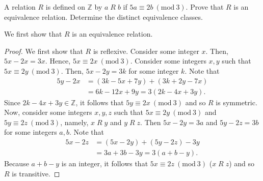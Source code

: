 \documentclass[12pt]{article}
\newcommand{\Z}{\mathbb{Z}}
\newcommand{\Mod}[1]{\ (\mathrm{mod}\ #1)}
\newenvironment{problem}[2][Problem]{\begin{trivlist} \item[\hskip \labelsep {\bfseries #1}\hskip \labelsep {\bfseries #2.}]}{\end{trivlist}}
\newenvironment{solution}[2][Solution]{\begin{trivlist} \item[\hskip \labelsep {\bfseries #1}\hskip \labelsep {\bfseries #2.}]}{\end{trivlist}}
\begin{document}
\begin{problem}{49}
  A relation $R$ is defined on $\Z$ by $a\; R\; b$ if $5a \equiv 2b \Mod 3$. Prove that $R$ is an equivalence relation. Determine the distinct equivalence classes.
  \begin{solution}{49}
    We first show that $R$ is an equivalence relation. 
    \begin{proof}
      We first show that $R$ is reflexive. Consider some integer $x$. Then, $5x-2x = 3x$. Hence, $5x \equiv 2x \Mod 3$. Consider some integers $x,y$ such that $5x \equiv 2y \Mod 3$. Then, $5x-2y =3k$ for some integer $k$. Note that
      \begin{align*}
	5y-2x &= (3k-5x+7y)+(3k+2y-7x) \\
	&= 6k-12x+9y = 3(2k-4x+3y).
      \end{align*}
     Since $2k-4x+3y \in \Z$, it follows that $5y \equiv 2x \Mod 3$ and so $R$ is symmetric. Now, consider some integers $x,y,z$ such that $5x \equiv 2y \Mod 3$ and $5y \equiv 2z \Mod 3$, namely, $x\; R \;y$ and $y\; R \;z$. Then $5x-2y = 3a$ and $5y-2z = 3b$ for some integers $a,b$. Note that
     \begin{align*}
       5x-2z &= (5x-2y)+(5y-2z)-3y\\
       &= 3a+3b-3y = 3(a+b-y).
     \end{align*}
     Because $a+b-y$ is an integer, it follows that $5x \equiv 2z \Mod 3$ ($x\; R \;z$) and so $R$ is transitive.
    \end{proof}


\end{solution}
\end{problem}
\end{document}
